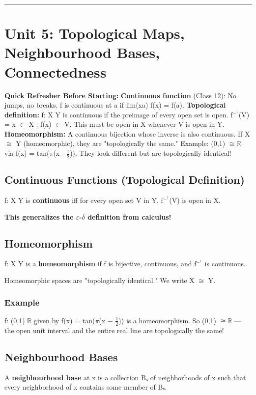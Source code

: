 \documentclass[12pt,a4paper,openany]{book}
\begin{document}
{{\bigskip\noindent\rule{\textwidth}{0.4pt}\bigskip

\section{Unit 5: Topological Maps, Neighbourhood Bases, Connectedness}

\begin{prereqbox}
 \textbf{Quick Refresher Before Starting:}
\textbf{Continuous function} (Class 12): No jumps, no breaks. f is continuous at a if lim(xa) f(x) = f(a).
\textbf{Topological definition:} f: X  Y is continuous if the preimage of every open set is open.
f$^{-}^1$(V) = {x $\in$ X : f(x) $\in$ V}. This must be open in X whenever V is open in Y.
\textbf{Homeomorphism:} A continuous bijection whose inverse is also continuous. If X $\cong$ Y (homeomorphic), they are "topologically the same."
Example: (0,1) $\cong\mathbb{R}$ via f(x) = tan($\pi$(x - $\frac{1}{2}$)). They look different but are topologically identical!
\end{prereqbox}


\subsection{Continuous Functions (Topological Definition) }

f: X  Y is \textbf{continuous} iff for every open set V in Y, f$^{-}^1$(V) is open in X.

\textbf{This generalizes the $\varepsilon$-$\delta$ definition from calculus!}

\subsection{Homeomorphism}
f: X  Y is a \textbf{homeomorphism} if f is bijective, continuous, and f$^{-}^1$ is continuous.

Homeomorphic spaces are "topologically identical." We write X $\cong$ Y.

\subsubsection{Example}
f: (0,1)  $\mathbb{R}$ given by f(x) = tan($\pi$(x − $\frac{1}{2}$)) is a homeomorphism.
So (0,1) $\cong\mathbb{R}$ — the open unit interval and the entire real line are topologically the same!

\subsection{Neighbourhood Bases}
A \textbf{neighbourhood base} at x is a collection Bₓ of neighborhoods of x such that every neighborhood of x contains some member of Bₓ.

}}
\end{document}
